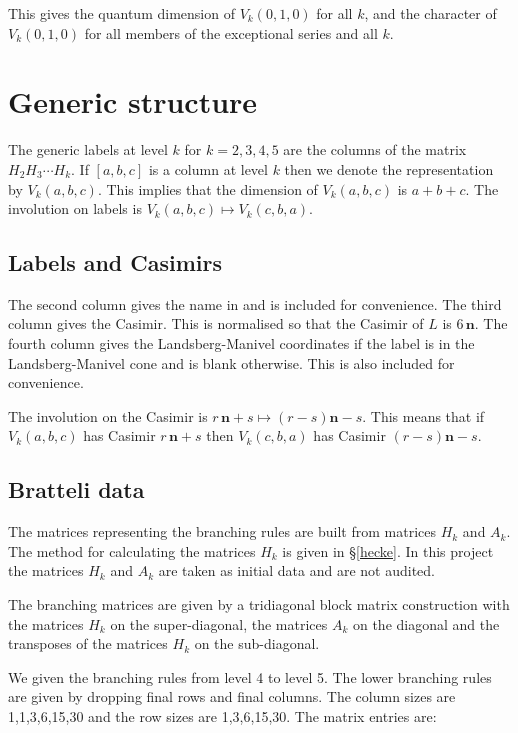 \documentclass[12pt]{amsart}
\providecommand{\nv}{\mathbf{n}}
\begin{document}
This gives the quantum dimension of $V_k(0,1,0)$ for all $k$, and the character of $V_k(0,1,0)$ for all members of the exceptional series and all $k$.


\section{Generic structure}
The generic labels at level $k$ for $k=2,3,4,5$ are the columns of the matrix 
$H_2H_3\dotsb H_k$. If $[a,b,c]$ is a column at level $k$ then we denote the 
representation by $V_k(a,b,c)$. This implies that the dimension of $V_k(a,b,c)$ is $a+b+c$.
The involution on labels is $V_k(a,b,c)\mapsto V_k(c,b,a)$.

\subsection{Labels and Casimirs}
The second column gives the name in \cite{cohen1996} and is included for convenience.
The third column gives the Casimir. This is normalised so that the Casimir of $L$ is $6\,\nv$.
The fourth column gives the Landsberg-Manivel coordinates if the label is in the
Landsberg-Manivel cone and is blank otherwise. This is also included for convenience.

The involution on the Casimir is $r\,\nv+s \mapsto (r-s)\nv-s$. This means that if
$V_k(a,b,c)$ has Casimir $r\,\nv+s$ then $V_k(c,b,a)$ has Casimir $(r-s)\nv-s$.







\subsection{Bratteli data}
The matrices representing the branching rules are built from matrices $H_k$ and $A_k$.
The method for calculating the matrices $H_k$ is given in \S\ref{hecke}. In this project
the matrices $H_k$ and $A_k$ are taken as initial data and are not audited.

The branching matrices are given by a tridiagonal block matrix construction with the
matrices $H_k$ on the super-diagonal, the matrices $A_k$ on the diagonal
and the transposes of the matrices $H_k$ on the sub-diagonal.

We given the branching rules from level 4 to level 5. The lower branching rules
are given by dropping final rows and final columns.
The column sizes are 1,1,3,6,15,30 and the row sizes are 1,3,6,15,30.
The matrix entries are:
\end{document}
